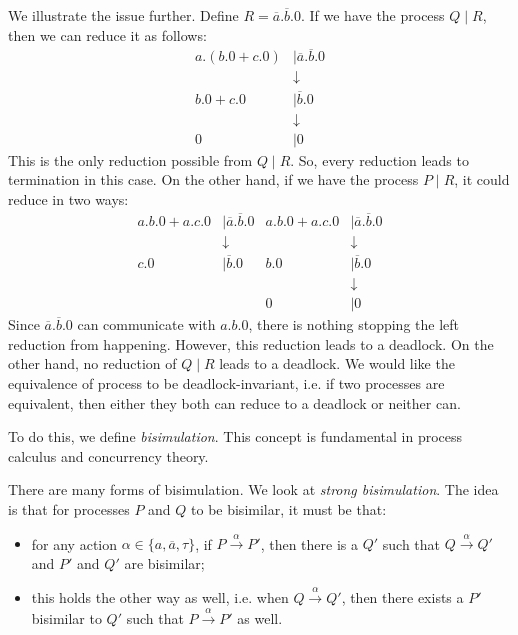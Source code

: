 \documentclass[a4paper, openany]{memoir}
\theoremstyle{definition}
\begin{document}
    We illustrate the issue further. Define $R = \overline{a}.\overline{b}.0$. If we have the process $Q \mid R$, then we can reduce it as follows:
    \begin{align*}
        a.(b.0 + c.0) &\mid \overline{a}.\overline{b}.0 \\
        &\downarrow \\
        b.0 + c.0 &\mid \overline{b}.0 \\
        &\downarrow \\
        0 &\mid 0
    \end{align*}
    This is the only reduction possible from $Q \mid R$. So, every reduction leads to termination in this case. On the other hand, if we have the process $P \mid R$, it could reduce in two ways:
    \begin{align*}
        a.b.0 + a.c.0 &\mid \overline{a}.\overline{b}.0  & a.b.0 + a.c.0 &\mid \overline{a}.\overline{b}.0 \\
        &\downarrow & &\downarrow \\
        c.0 &\mid \overline{b}.0 & b.0 &\mid \overline{b}.0 \\
        & & &\downarrow \\
        & & 0 &\mid 0
    \end{align*}
    Since $\overline{a}.\overline{b}.0$ can communicate with $a.b.0$, there is nothing stopping the left reduction from happening. However, this reduction leads to a deadlock. On the other hand, no reduction of $Q \mid R$ leads to a deadlock. We would like the equivalence of process to be deadlock-invariant, i.e. if two processes are equivalent, then either they both can reduce to a deadlock or neither can.

    To do this, we define \emph{bisimulation}. This concept is fundamental in process calculus and concurrency theory.

    There are many forms of bisimulation. We look at \emph{strong bisimulation}. The idea is that for processes $P$ and $Q$ to be bisimilar, it must be that:
    \begin{itemize}
        \item for any action $\alpha \in \{a, \overline{a}, \tau\}$, if $P \xrightarrow{\alpha} P'$, then there is a $Q'$ such that $Q \xrightarrow{\alpha} Q'$ and $P'$ and $Q'$ are bisimilar;
        \item this holds the other way as well, i.e. when $Q \xrightarrow{\alpha} Q'$, then there exists a $P'$ bisimilar to $Q'$ such that $P \xrightarrow{\alpha} P'$ as well.
    \end{itemize}
\end{document}
